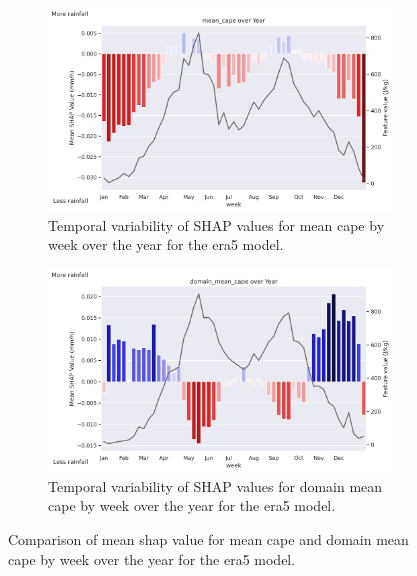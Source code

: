 \begin{figure}[ht]
    \centering
    \begin{subfigure}[t]{\textwidth}
        \centering
        \includegraphics[width=\textwidth]{../figures/generated/experiments/obs_precipitation/temporal_corr/obs_precipitation_era5_shap_mean_cape_by_week_over_year.png}
        \caption{Temporal variability of SHAP values for mean \acrshort{cape} by week over the year for the \acrshort{era5} model.}
        \label{fig:obs_precipitation_era5_shap_mean_cape_by_week_over_year}
    \end{subfigure}
    \vspace{1em}
    \begin{subfigure}[t]{\textwidth}
        \centering
        \includegraphics[width=\textwidth]{../figures/generated/experiments/obs_precipitation/temporal_corr/obs_precipitation_era5_shap_domain_mean_cape_by_week_over_year.png}
        \caption{Temporal variability of SHAP values for domain mean \acrshort{cape} by week over the year for the \acrshort{era5} model.}
        \label{fig:obs_precipitation_era5_shap_domain_mean_cape_by_week_over_year}
    \end{subfigure}
    \caption{Comparison of mean \acrshort{shap} value for mean \acrshort{cape} and domain mean \acrshort{cape} by week over the year for the \acrshort{era5} model.}
    \label{fig:obs_precipitation_cape_by_week_over_year}
\end{figure}

